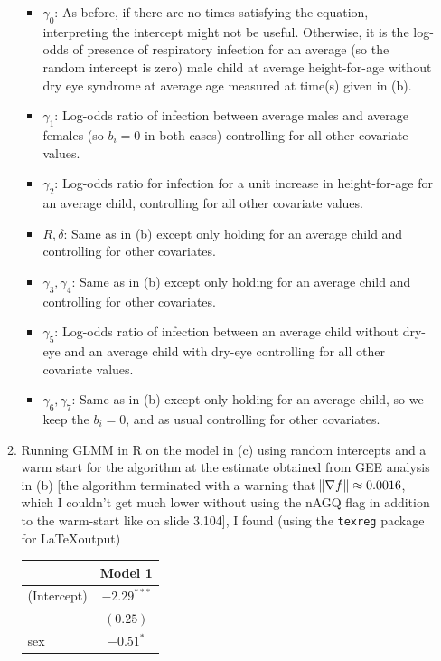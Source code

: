 \documentclass[11pt]{article}
\begin{document}
\begin{enumerate}
\begin{enumerate}
\[			\]
			\begin{itemize}
				\item $\gamma_0$: As before, if there are no times satisfying the equation, interpreting the intercept might not be useful. Otherwise, it is the log-odds of presence of respiratory infection for an average (so the random intercept is zero) male child at average height-for-age without dry eye syndrome at average age measured at time(s) given in (b). 
				\item $\gamma_1$: Log-odds ratio of infection between average males and average females (so $b_i=0$ in both cases) controlling for all other covariate values.
				\item $\gamma_2$: Log-odds ratio for infection for a unit increase in height-for-age for an average child, controlling for all other covariate values.
				\item $R, \delta$: Same as in (b) except only holding for an average child and controlling for other covariates.
				\item $\gamma_3, \gamma_4$: Same as in (b) except only holding for an average child and controlling for other covariates.
				\item $\gamma_5$: Log-odds ratio of infection between an average child without dry-eye and an average child with dry-eye  controlling for all other covariate values.
				\item $\gamma_6, \gamma_7$: Same as in (b) except only holding for an average child, so we keep the $b_i=0$, and as usual controlling for other covariates.
			\end{itemize}
			\item Running GLMM in R on the model in (c) using random intercepts and a warm start for the algorithm at the estimate obtained from GEE analysis in (b) [the algorithm terminated with a warning that $\norm{\nabla f} \approx 0.0016$, which I couldn't get much lower without using the nAGQ flag in addition to the warm-start like on slide 3.104], I found (using the \texttt{texreg} package for \LaTeX  output)
\begin{table}[H]
\begin{center}
\begin{tabular}{l c }
\hline
 & Model 1 \\
\hline
(Intercept)                     & $-2.29^{***}$ \\
                                & $(0.25)$      \\
sex                             & $-0.51^{*}$   \\

\end{tabular}
\end{center}
\end{table}
\end{enumerate}
\end{enumerate}
\end{document}
